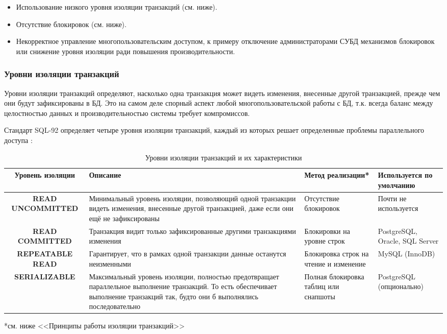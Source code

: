 \begin{itemize}
    \item Использование низкого уровня изоляции транзакций (см. ниже).
    \item Отсутствие блокировок (см. ниже).
    \item Некорректное управление многопользовательским доступом, к примеру отключение администраторами СУБД механизмов блокировок или снижение уровня изоляции ради повышения производительности.
\end{itemize}

\subsubsection{Уровни изоляции транзакций}

Уровни изоляции транзакций определяют, насколько одна транзакция может видеть изменения, внесенные другой транзакцией, прежде чем они будут зафиксированы в БД. Это на самом деле спорный аспект любой многопользовательской работы с БД, т.к. всегда баланс между целостностью данных и производительностью системы требует компромиссов.

Стандарт SQL-92 определяет четыре уровня изоляции транзакций, каждый из которых решает определенные проблемы параллельного доступа \autocite{ElmasriNavathe, Silberschatz}:

\begin{table}[H]
    \centering
    \begin{tabular}{|c|p{4.25cm}|p{3.25cm}|p{3cm}|}
        \hline
        \textbf{Уровень изоляции} & \textbf{Описание} & \textbf{Метод реализации*} & \textbf{Используется по умолчанию} \\
        \hline
        \textbf{READ UNCOMMITTED} & Минимальный уровень изоляции, позволяющий одной транзакции видеть изменения, внесенные другой транзакцией, даже если они ещё не зафиксированы & Отсутствие блокировок & Почти не используется \\
        \hline
        \textbf{READ COMMITTED} & Транзакция видит только зафиксированные другими транзакциями изменения & Блокировки на уровне строк & PostgreSQL, Oracle, SQL Server \\
        \hline
        \textbf{REPEATABLE READ} & Гарантирует, что в рамках одной транзакции данные останутся неизменными & Блокировка строк на чтение и изменение & MySQL (InnoDB) \\
        \hline
        \textbf{SERIALIZABLE} & Максимальный уровень изоляции, полностью предотвращает параллельное выполнение транзакций. То есть обеспечивает выполнение транзакций так, будто они б выполнялись последовательно & Полная блокировка таблиц или снапшоты & PostgreSQL (опционально) \\
        \hline
    \end{tabular}
    \caption{Уровни изоляции транзакций и их характеристики}
    \label{tab:isolation_levels}
\end{table}
 *см. ниже <<Принципы работы изоляции транзакций>>

